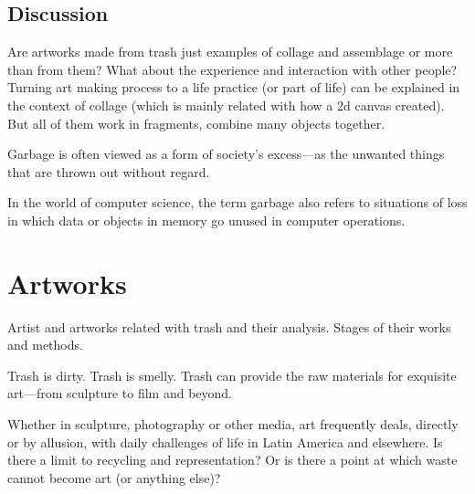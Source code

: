 \documentclass[12pt]{article}
\begin{document}
\subsection{Discussion}
Are artworks made from trash just examples of collage and assemblage or more than from them? What about the experience and interaction with other people? Turning art making process to a life practice (or part of life) can be explained in the context of collage (which is mainly related with how a 2d canvas created). But all of them work in fragments, combine many objects together. 

Garbage is often viewed as a form of society’s excess---as the unwanted things that are thrown out without regard. 

In the world of computer science, the term garbage also refers to situations of loss in which data or objects in memory go unused in computer operations.

\section{Artworks}
Artist and artworks related with trash and their analysis. Stages of their works and methods.

Trash is dirty. Trash is smelly. Trash can provide the raw materials for exquisite art---from sculpture to film and beyond.

Whether in sculpture, photography or other media, art frequently deals, directly or by allusion, with daily challenges of life in Latin America and elsewhere. Is there a limit to recycling and representation? Or is there a point at which waste cannot become art (or anything else)?
\end{document}
